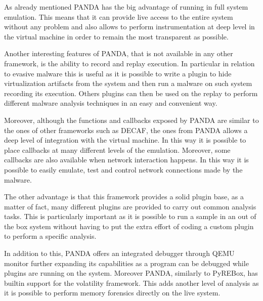 As already mentioned PANDA has the big advantage of running in full system emulation. This means that it can provide live access to the entire system without any problem and also allows to perform instrumentation at deep level in the virtual machine in order to remain the most transparent as possible. 

Another interesting features of PANDA, that is not available in any other framework, is the ability to record and replay execution. In particular in relation to evasive malware this is useful as it is possible to write a plugin to hide virtualization artifacts from the system and then run a malware on such system recording its execution. Others plugins can then be used on the replay to perform different malware analysis techniques in an easy and convenient way.

Moreover, although the functions and callbacks exposed by PANDA are similar to the ones of other frameworks such as DECAF, the ones from PANDA allows a deep level of integration with the virtual machine. In this way it is possible to place callbacks at many different levels of the emulation. Moreover, some callbacks are also available when network interaction happens. In this way it is possible to easily emulate, test and control network connections made by the malware. 

The other advantage is that this framework provides a solid plugin base, as a matter of fact, many different plugins are provided to carry out common analysis tasks. This is particularly important as it is possible to run a sample in an out of the box system without having to put the extra effort of coding a custom plugin to perform a specific analysis. 

In addition to this, PANDA offers an integrated debugger through QEMU monitor further expanding its capabilities as a program can be debugged while plugins are running on the system. Moreover PANDA, similarly to PyREBox, has builtin support for the volatility framework. This adds another level of analysis as it is possible to perform memory forensics directly on the live system.
